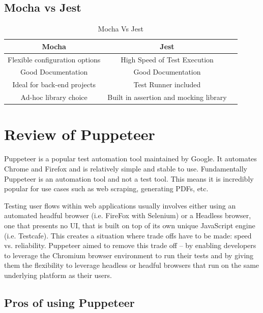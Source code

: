 \documentclass[12pt,a4paper,titlepage]{report}
\begin{document}
\subsection{Mocha vs Jest}

\begin{table}[H]
  \centering
  \small
  \setlength\tabcolsep{6pt}
  \begin{tabular}{|c|c|c}
    \hline \textbf
    {Mocha}              & \textbf {Jest}\\
    \hline\hline
    Flexible configuration options & High Speed of Test Execution\\
    \hline
    Good Documentation             & Good Documentation\\
    \hline
    Ideal for back-end projects    & Test Runner included\\
    \hline
    Ad-hoc library choice          & Built in assertion and mocking library\\
    \hline
  \end{tabular}
  \caption{Mocha Vs Jest}
\label{table:mocha:jest}
\end{table}

\section{Review of Puppeteer}

Puppeteer is a popular test automation tool maintained by Google. It automates Chrome and Firefox and is relatively simple and stable to use.
Fundamentally Puppeteer is an automation tool and not a test tool.
This means it is incredibly popular for use cases such as web scraping, generating PDFs, etc.

Testing user flows within web applications usually involves either using an automated headful
browser (i.e. FireFox with Selenium) or a Headless browser, one that presents no UI, that is built on top of its own unique JavaScript
engine (i.e. Testcafe). This creates a situation where trade offs have to be made: speed vs. reliability.
Puppeteer aimed to remove this trade off – by enabling developers to leverage the Chromium browser environment
to run their tests and by giving them the flexibility to leverage headless or headful browsers that run on the same underlying platform as their users.

\subsection{Pros of using Puppeteer}
\end{document}
